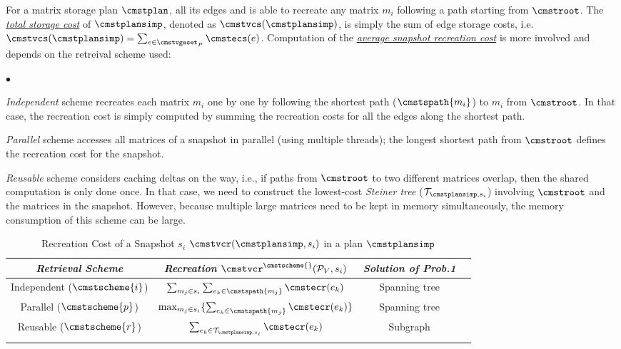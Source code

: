 \documentclass[conference]{IEEEtran}
\begin{document}
For a matrix storage plan $\cmstplan$, \weightstore\stores all its edges and is able to recreate any matrix $m_i$ following a path starting from $\cmstroot$. The \underline{\emph{total storage cost}} of $\cmstplansimp$, denoted as $\cmstvcs(\cmstplansimp)$, is simply the sum of edge storage costs, i.e.
$\cmstvcs(\cmstplansimp) = \sum_{e\in\cmstvgeset_P} \cmstecs(e)$. 
Computation of the  \underline{\emph{average snapshot recreation cost}} is more involved and depends on the retreival scheme used:
\begin{list}{$\bullet$}{\leftmargin 0.10in \topsep -2pt} %
\item \emph{Independent} scheme recreates each matrix $m_i$ one by one by following the shortest path ($\cmstspath{m_i}$) to $m_i$ from $\cmstroot$. In that case, the recreation cost is simply computed by summing the recreation costs for all the edges along the shortest path.

\item \emph{Parallel} scheme accesses all matrices of a snapshot in parallel (using multiple threads); the longest shortest path from $\cmstroot$ defines the recreation cost for the snapshot. 
\item \emph{Reusable} scheme considers caching deltas on the way, i.e., if paths from $\cmstroot$ to two different matrices overlap, then the shared computation is only done once. In that case, we need to construct the lowest-cost {\em Steiner tree} ($\mathcal{T}_{\cmstplansimp, s_i}$) involving $\cmstroot$ and the matrices in the snapshot. However, because multiple large matrices need to be kept in memory simultaneously, the memory consumption of this scheme can be large.
\end{list}
\begin{table}[!h]
\centering
\begin{tabular}{cccc} 
\toprule
\emph{Retrieval Scheme} & \emph{Recreation} $\cmstvcr^{\cmstscheme{}}(\mathcal{P}_V, s_i)$ & \emph{Solution of Prob.1}
\\ %
\midrule
Independent ($\cmstscheme{i}$) & $\sum_{m_j \in s_i} \sum_{e_k \in \cmstspath{m_j}} \cmstecr(e_k) $ & Spanning tree \\ 
Parallel ($\cmstscheme{p}$) & $\max_{m_j \in s_i}\{\sum_{e_k \in \cmstspath{m_j}} \cmstecr(e_k)\}$ & Spanning tree  \\ 
Reusable ($\cmstscheme{r}$) & $\sum_{e_k \in \mathcal{T}_{\cmstplansimp, s_i}} \cmstecr(e_k)$ & Subgraph \\ 
\bottomrule
\vspace{0.1mm}
\end{tabular}
\caption{Recreation Cost of a Snapshot $s_i$ $\cmstvcr(\cmstplansimp,s_i)$ in a plan $\cmstplansimp$}
\label{tb:steiner_tree}
\end{table}
\end{document}
